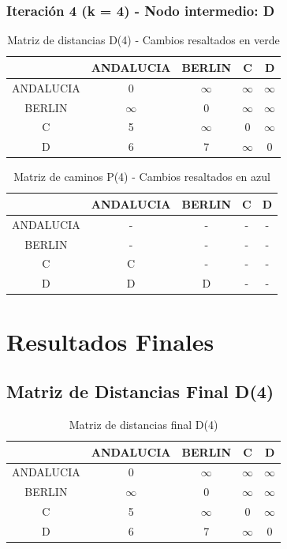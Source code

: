 \documentclass[12pt]{article}
\begin{document}
\subsubsection{Iteración 4 (k = 4) - Nodo intermedio: D}
\begin{table}[h!]
\centering
\begin{tabular}{|c|c|c|c|c|}
\hline
 & ANDALUCIA & BERLIN & C & D \\\hline
ANDALUCIA & 0 & $\infty$ & $\infty$ & $\infty$ \\\hline
BERLIN & $\infty$ & 0 & $\infty$ & $\infty$ \\\hline
C & 5 & $\infty$ & 0 & $\infty$ \\\hline
D & 6 & 7 & $\infty$ & 0 \\\hline
\end{tabular}
\caption{Matriz de distancias D(4) - Cambios resaltados en verde}
\end{table}

\begin{table}[h!]
\centering
\begin{tabular}{|c|c|c|c|c|}
\hline
 & ANDALUCIA & BERLIN & C & D \\\hline
ANDALUCIA & - & - & - & - \\\hline
BERLIN & - & - & - & - \\\hline
C & C & - & - & - \\\hline
D & D & D & - & - \\\hline
\end{tabular}
\caption{Matriz de caminos P(4) - Cambios resaltados en azul}
\end{table}

\clearpage
\section{Resultados Finales}
\subsection{Matriz de Distancias Final D(4)}
\begin{table}[h!]
\centering
\begin{tabular}{|c|c|c|c|c|}
\hline
 & ANDALUCIA & BERLIN & C & D \\\hline
ANDALUCIA & 0 & $\infty$ & $\infty$ & $\infty$ \\\hline
BERLIN & $\infty$ & 0 & $\infty$ & $\infty$ \\\hline
C & 5 & $\infty$ & 0 & $\infty$ \\\hline
D & 6 & 7 & $\infty$ & 0 \\\hline
\end{tabular}
\caption{Matriz de distancias final D(4)}
\end{table}
\end{document}
